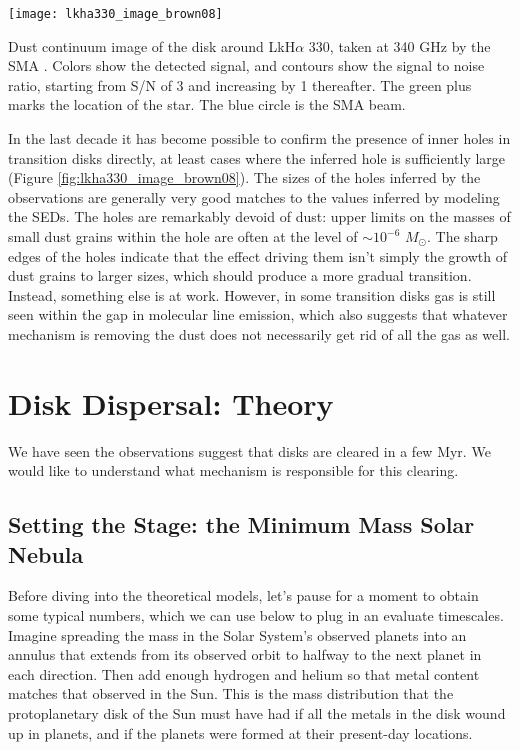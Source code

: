 \begin{marginfigure}
\texttt{[image: lkha330\_image\_brown08]}
\caption[Dust continuum image of the disk around LkH$\alpha$ 330]{
\label{fig:lkha330_image_brown08}
Dust continuum image of the disk around LkH$\alpha$ 330, taken at 340 GHz by the SMA \citep{brown08a}. Colors show the detected signal, and contours show the signal to noise ratio, starting from S/N of 3 and increasing by 1 thereafter. The green plus marks the location of the star. The blue circle is the SMA beam.
}
\end{marginfigure}

In the last decade it has become possible to confirm the presence of inner holes in transition disks directly, at least cases where the inferred hole is sufficiently large (Figure \ref{fig:lkha330_image_brown08}). The sizes of the holes inferred by the observations are generally very good matches to the values inferred by modeling the SEDs. The holes are remarkably devoid of dust: upper limits on the masses of small dust grains within the hole are often at the level of $\sim 10^{-6}$ $M_\odot$. The sharp edges of the holes indicate that the effect driving them isn't simply the growth of dust grains to larger sizes, which should produce a more gradual transition. Instead, something else is at work. However, in some transition disks gas is still seen within the gap in molecular line emission, which also suggests that whatever mechanism is removing the dust does not necessarily get rid of all the gas as well.

\section{Disk Dispersal: Theory}

We have seen the observations suggest that disks are cleared in a few Myr. We would like to understand what mechanism is responsible for this clearing.

\subsection{Setting the Stage: the Minimum Mass Solar Nebula}

Before diving into the theoretical models, let's pause for a moment to obtain some typical numbers, which we can use below to plug in an evaluate timescales. Imagine spreading the mass in the Solar System's observed planets into an annulus that extends from its observed orbit to halfway to the next planet in each direction. Then add enough hydrogen and helium so that metal content matches that observed in the Sun. This is the mass distribution that the protoplanetary disk of the Sun must have had if all the metals in the disk wound up in planets, and if the planets were formed at their present-day locations.

